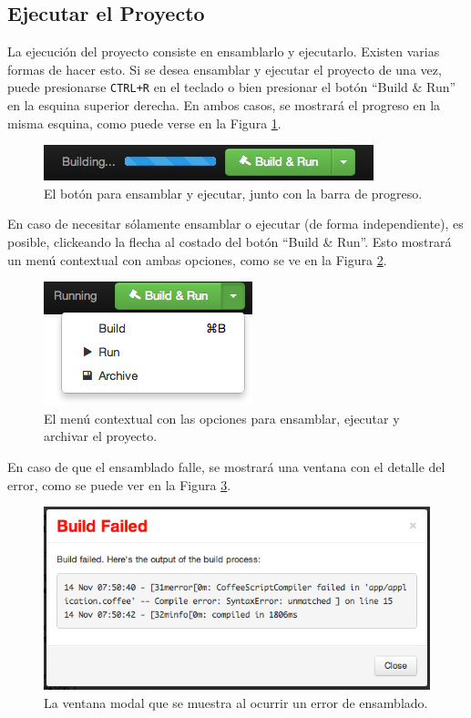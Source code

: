 \documentclass[12pt,spanish,letter]{report}
\makeatletter
\def\maxwidth{\ifdim\Gin@nat@width>\linewidth\linewidth
\else\Gin@nat@width\fi}
\let\Oldincludegraphics\includegraphics
\renewcommand{\includegraphics}[1]{\Oldincludegraphics[width=\maxwidth]{#1}}
\makeatother
\begin{document}
\subsection{Ejecutar el Proyecto}

La ejecución del proyecto consiste en ensamblarlo y ejecutarlo. Existen
varias formas de hacer esto. Si se desea ensamblar y ejecutar el
proyecto de una vez, puede presionarse \texttt{CTRL+R} en el teclado o
bien presionar el botón ``Build \& Run'' en la esquina superior derecha.
En ambos casos, se mostrará el progreso en la misma esquina, como puede
verse en la Figura \ref{figures:tutorial-build}.

\begin{figure}[htbp]
\centering
\includegraphics{figures/tutorial-build.png}
\caption{El botón para ensamblar y ejecutar, junto con la barra de
progreso. \label{figures:tutorial-build}}
\end{figure}

En caso de necesitar sólamente ensamblar o ejecutar (de forma
independiente), es posible, clickeando la flecha al costado del botón
``Build \& Run''. Esto mostrará un menú contextual con ambas opciones,
como se ve en la Figura \ref{figures:tutorial-contextual}.

\begin{figure}[htbp]
\centering
\includegraphics{figures/tutorial-contextual.png}
\caption{El menú contextual con las opciones para ensamblar, ejecutar y
archivar el proyecto. \label{figures:tutorial-contextual}}
\end{figure}

En caso de que el ensamblado falle, se mostrará una ventana con el
detalle del error, como se puede ver en la Figura
\ref{figures:tutorial-error}.

\begin{figure}[htbp]
\centering
\includegraphics{figures/tutorial-error.png}
\caption{La ventana modal que se muestra al ocurrir un error de
ensamblado. \label{figures:tutorial-error}}
\end{figure}
\end{document}
